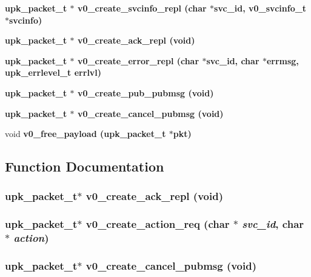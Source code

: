 \begin{CompactItemize}
\bf{upk\_\-packet\_\-t} $\ast$ \bf{v0\_\-create\_\-svcinfo\_\-repl} (char $\ast$svc\_\-id, \bf{v0\_\-svcinfo\_\-t} $\ast$svcinfo)
\item 
\bf{upk\_\-packet\_\-t} $\ast$ \bf{v0\_\-create\_\-ack\_\-repl} (void)
\item 
\bf{upk\_\-packet\_\-t} $\ast$ \bf{v0\_\-create\_\-error\_\-repl} (char $\ast$svc\_\-id, char $\ast$errmsg, \bf{upk\_\-errlevel\_\-t} errlvl)
\item 
\bf{upk\_\-packet\_\-t} $\ast$ \bf{v0\_\-create\_\-pub\_\-pubmsg} (void)
\item 
\bf{upk\_\-packet\_\-t} $\ast$ \bf{v0\_\-create\_\-cancel\_\-pubmsg} (void)
\item 
void \bf{v0\_\-free\_\-payload} (\bf{upk\_\-packet\_\-t} $\ast$pkt)
\end{CompactItemize}


\subsection{Function Documentation}
\subsubsection{\setlength{\rightskip}{0pt plus 5cm}\bf{upk\_\-packet\_\-t}$\ast$ v0\_\-create\_\-ack\_\-repl (void)}\label{upk__v0__protocol_8h_5ea3fb24528535a2a08943f7dcce85bc}


\subsubsection{\setlength{\rightskip}{0pt plus 5cm}\bf{upk\_\-packet\_\-t}$\ast$ v0\_\-create\_\-action\_\-req (char $\ast$ {\em svc\_\-id}, char $\ast$ {\em action})}\label{upk__v0__protocol_8h_ac4eef1f8bc3804cd3e76d40d4b84ae6}


\subsubsection{\setlength{\rightskip}{0pt plus 5cm}\bf{upk\_\-packet\_\-t}$\ast$ v0\_\-create\_\-cancel\_\-pubmsg (void)}\label{upk__v0__protocol_8h_0391f0ee6032ec320ebd72df6e478c80}


